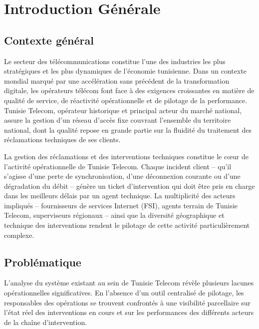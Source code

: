 \documentclass[11pt,a4paper]{report}
\begin{document}
\tableofcontents
\listoftables

\clearpage

\chapter*{Introduction Générale}

\section*{Contexte général}

Le secteur des télécommunications constitue l'une des industries les plus stratégiques et les plus dynamiques de l'économie tunisienne. Dans un contexte mondial marqué par une accélération sans précédent de la transformation digitale, les opérateurs télécom font face à des exigences croissantes en matière de qualité de service, de réactivité opérationnelle et de pilotage de la performance. Tunisie Telecom, opérateur historique et principal acteur du marché national, assure la gestion d'un réseau d'accès fixe couvrant l'ensemble du territoire national, dont la qualité repose en grande partie sur la fluidité du traitement des réclamations techniques de ses clients.

La gestion des réclamations et des interventions techniques constitue le c\oe ur de l'activité opérationnelle de Tunisie Telecom. Chaque incident client -- qu'il s'agisse d'une perte de synchronisation, d'une déconnexion courante ou d'une dégradation du débit -- génère un ticket d'intervention qui doit être pris en charge dans les meilleurs délais par un agent technique. La multiplicité des acteurs impliqués -- fournisseurs de services Internet (FSI), agents terrain de Tunisie Telecom, superviseurs régionaux -- ainsi que la diversité géographique et technique des interventions rendent le pilotage de cette activité particulièrement complexe.

\section*{Problématique}

L'analyse du système existant au sein de Tunisie Telecom révèle plusieurs lacunes opérationnelles significatives. En l'absence d'un outil centralisé de pilotage, les responsables des opérations se trouvent confrontés à une visibilité parcellaire sur l'état réel des interventions en cours et sur les performances des différents acteurs de la chaîne d'intervention.
\end{document}
